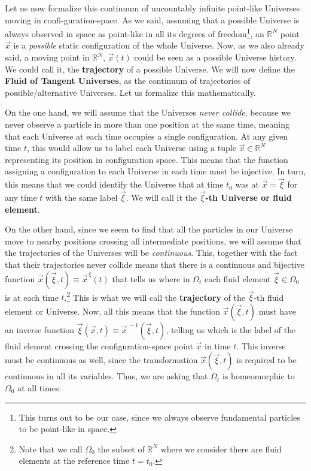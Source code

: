 \documentclass[11pt, a4paper]{article} %
\newcommand{\R}{\mathbb{R}} %
\begin{document}
Let us now formalize this continuum of uncountably infinite point-like Universes moving in confi-guration-space. As we said, assuming that a possible Universe is always observed in space as point-like in all its degrees of freedom\footnote{This turns out to be our case, since we always observe fundamental particles to be point-like in space.}, an $\R^N$ point $\vec{x}$ is a {\em possible} static configuration of the whole Universe. Now, as we also already said, a moving point in $\R^N$, $\vec{x}(t)$ could be seen as a possible Universe history. We could call it, the {\bf trajectory} of a possible Universe. We will now define the {\bf Fluid of Tangent Universes}, as the continuum of trajectories of possible/alternative Universes. Let us formalize this mathematically.

On the one hand, we will assume that the Universes {\em never collide}, because we never observe a particle in more than one position at the same time, meaning that each Universe at each time occupies a single configuration. At any given time $t$, this would allow us to label each Universe using a tuple $\vec{x}\in\R^N$ representing its position in configuration space. This means that the function assigning a configuration to each Universe in each time must be injective. In turn, this means that we could identify the Universe that at time $t_0$ was at $\vec{x}=\vec{\xi}$ for any time $t$ with the same label $\vec{\xi}$. We will call it the {\bf $\vec{\xi}$-th Universe or fluid element}. 


On the other hand, since we seem to find that all the particles in our Universe move to nearby positions crossing all intermediate positions, we will assume that the trajectories of the Universes will be {\em continuous}. This, together with the fact that their trajectories never collide means that there is a continuous and bijective function $\vec{x}(\vec{\xi},t)\equiv \vec{x}^{\, \xi}(t)$ that tells us where in $\Omega_t$ each fluid element $\vec{\xi}\in\Omega_0$ is at each time $t$.\footnote{Note that we call $\Omega_0$ the subset of $\R^N$ where we consider there are fluid elements at the reference time $t=t_0$. } This is what we will call the {\bf trajectory} of the $\vec{\xi}$-th fluid element or Universe. Now, all this means that the function $\vec{x}(\vec{\xi},t)$ must have an inverse function $\vec{\xi}(\vec{x},t)\equiv \vec{x}^{\, -1}(\vec{\xi},t)$, telling us which is the label of the fluid element crossing the configuration-space point $\vec{x}$ in time $t$. This inverse must be continuous as well, since the transformation $\vec{x}(\vec{\xi},t)$ is required to be continuous in all its variables. Thus, we are asking that $\Omega_t$ is homeomorphic to $\Omega_0$ at all times.
\end{document}
